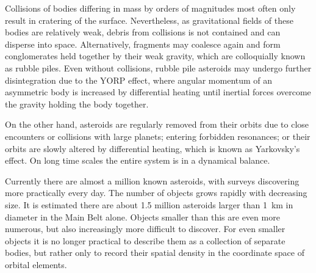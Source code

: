         Collisions of bodies differing in mass by orders of magnitudes most often
        only result in cratering of the surface. Nevertheless, as gravitational fields of these bodies
        are relatively weak, debris from collisions is not contained and can disperse into space.
        Alternatively, fragments may coalesce again and form conglomerates held together by their weak gravity,
        which are colloquially known as rubble piles.
        Even without collisions, rubble pile asteroids may undergo further disintegration due to the YORP effect,
        where angular momentum of an asymmetric body is increased by differential heating
        until inertial forces overcome the gravity holding the body together.

        On the other hand, asteroids are regularly removed from their orbits due to
        close encounters or collisions with large planets; entering forbidden resonances;
        or their orbits are slowly altered by differential heating, which is known as Yarkovsky's effect.
        On long time scales the entire system is in a dynamical balance.

        Currently there are almost a million known asteroids, with surveys discovering more practically every day.
        The number of objects grows rapidly with decreasing size. It is estimated there are about \num{1.5} million
        asteroids larger than \SI{1}{\kilo\metre} in diameter in the Main Belt alone.
        Objects smaller than this are even more numerous, but also increasingly more difficult to discover.
        For even smaller objects it is no longer practical to describe them as a collection of separate bodies,
        but rather only to record their spatial density in the coordinate space of orbital elements.




